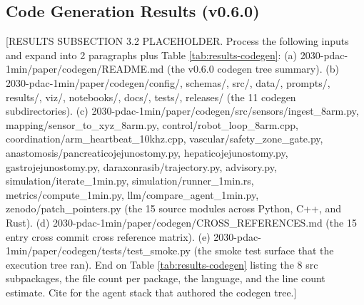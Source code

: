 \subsection{Code Generation Results (v0.6.0)}
\label{sec:results-codegen}

[RESULTS SUBSECTION 3.2 PLACEHOLDER. Process the following inputs and expand into 2 paragraphs plus Table \ref{tab:results-codegen}:
(a) 2030-pdac-1min/paper/codegen/README.md (the v0.6.0 codegen tree summary).
(b) 2030-pdac-1min/paper/codegen/{config/, schemas/, src/, data/, prompts/, results/, viz/, notebooks/, docs/, tests/, releases/} (the 11 codegen subdirectories).
(c) 2030-pdac-1min/paper/codegen/src/{sensors/ingest_8arm.py, mapping/sensor_to_xyz_8arm.py, control/robot_loop_8arm.cpp, coordination/arm_heartbeat_10khz.cpp, vascular/safety_zone_gate.py, anastomosis/{pancreaticojejunostomy.py, hepaticojejunostomy.py, gastrojejunostomy.py}, daraxonrasib/{trajectory.py, advisory.py}, simulation/iterate_1min.py, simulation/runner_1min.rs, metrics/compute_1min.py, llm/compare_agent_1min.py, zenodo/patch_pointers.py} (the 15 source modules across Python, C++, and Rust).
(d) 2030-pdac-1min/paper/codegen/CROSS_REFERENCES.md (the 15 entry cross commit cross reference matrix).
(e) 2030-pdac-1min/paper/codegen/tests/test_smoke.py (the smoke test surface that the execution tree ran).
End on Table \ref{tab:results-codegen} listing the 8 src subpackages, the file count per package, the language, and the line count estimate. Cite \cite{claude-code, claude-opus-47} for the agent stack that authored the codegen tree.]

